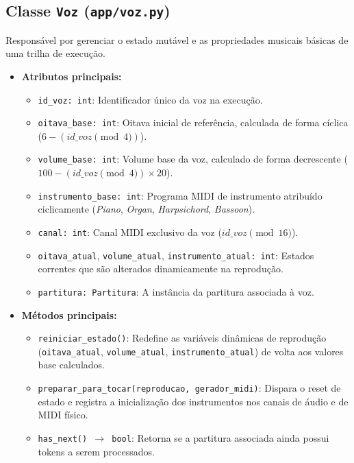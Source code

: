 \documentclass[12pt, a4paper]{article}
\begin{document}
\subsection{Classe \texttt{Voz} (\texttt{app/voz.py})}
Responsável por gerenciar o estado mutável e as propriedades musicais básicas de uma trilha de execução.
\begin{itemize}
  \item \textbf{Atributos principais:}
    \begin{itemize}
      \item \texttt{id\_voz: int}: Identificador único da voz na execução.
      \item \texttt{oitava\_base: int}: Oitava inicial de referência, calculada de forma cíclica ($6 - (id\_voz \pmod 4)$).
      \item \texttt{volume\_base: int}: Volume base da voz, calculado de forma decrescente ($100 - (id\_voz \pmod 4) \times 20$).
      \item \texttt{instrumento\_base: int}: Programa MIDI de instrumento atribuído ciclicamente (\textit{Piano}, \textit{Organ}, \textit{Harpsichord}, \textit{Bassoon}).
      \item \texttt{canal: int}: Canal MIDI exclusivo da voz ($id\_voz \pmod{16}$).
      \item \texttt{oitava\_atual}, \texttt{volume\_atual}, \texttt{instrumento\_atual: int}: Estados correntes que são alterados dinamicamente na reprodução.
      \item \texttt{partitura: Partitura}: A instância da partitura associada à voz.
    \end{itemize}
  \item \textbf{Métodos principais:}
    \begin{itemize}
      \item \texttt{reiniciar\_estado()}: Redefine as variáveis dinâmicas de reprodução (\texttt{oitava\_atual}, \texttt{volume\_atual}, \texttt{instrumento\_atual}) de volta aos valores base calculados.
      \item \texttt{preparar\_para\_tocar(reproducao, gerador\_midi)}: Dispara o reset de estado e registra a inicialização dos instrumentos nos canais de áudio e de MIDI físico.
      \item \texttt{has\_next() $\rightarrow$ bool}: Retorna se a partitura associada ainda possui tokens a serem processados.
    \end{itemize}
\end{itemize}
\end{document}
